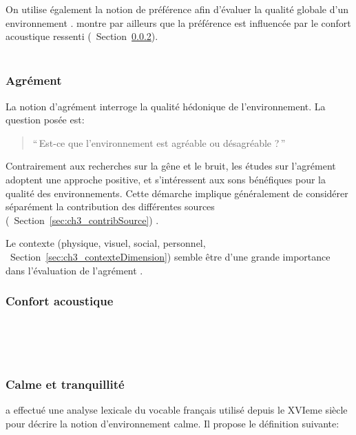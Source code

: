 On utilise également la notion de préférence afin d'évaluer la qualité globale d'un environnement \citep{yu2010factors}. \citep{hong2013designing} montre par ailleurs que la préférence est influencée par le confort acoustique ressenti (\cf~Section~\ref{sec:ch3_confort}).\\

\\


\subsubsection{Agrément}

La notion d'agrément interroge la qualité hédonique de l'environnement. La question posée est:

\begin{quote}
``\,Est-ce que l'environnement est agréable ou désagréable ?\,''
\end{quote}
 

Contrairement aux recherches sur la gêne et le bruit, les études sur l'agrément adoptent une approche positive, et s'intéressent aux sons bénéfiques pour la qualité des environnements. Cette démarche implique généralement de considérer séparément la contribution des différentes sources (\cf~Section~\ref{sec:ch3_contribSource})  \citep{lavandier2006contribution,garcia2012validation}.

Le contexte (physique, visuel, social, personnel, \cf~Section~\ref{sec:ch3_contexteDimension}) semble être d'une grande importance dans l'évaluation de l'agrément \citep{guillen2007importance}.

\subsubsection{Confort acoustique}
\label{sec:ch3_confort}

\\
\\
\\

\subsubsection{Calme et tranquillité}

\citep{delaitre2012definition} a effectué une analyse lexicale du vocable  français utilisé depuis le XVIeme siècle pour décrire la notion d'environnement calme. Il propose le définition suivante:

